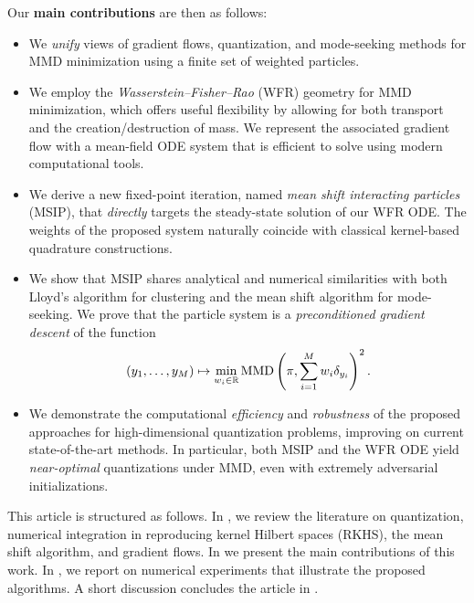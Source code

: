Our \textbf{main contributions} are then as follows:
\begin{itemize}
\item We \textit{unify} views of gradient flows, quantization, and mode-seeking methods for MMD minimization using a finite set of weighted particles.


\item We employ the \emph{Wasserstein--Fisher--Rao} (WFR) geometry for MMD minimization, which offers useful flexibility by allowing for both transport and the creation/destruction of mass. We represent the associated gradient flow with a mean-field ODE system that is efficient to solve using modern computational tools. 

\item We derive a new fixed-point iteration, named \emph{mean shift interacting particles} (MSIP), that \textit{directly} targets the steady-state solution of our WFR ODE. The weights of the proposed system naturally coincide with classical kernel-based quadrature constructions. 

\item We show that MSIP shares analytical and numerical similarities with both Lloyd's algorithm for clustering and the mean shift algorithm for mode-seeking. We prove that the particle system is a \textit{preconditioned gradient descent} of the function $$(y_1, \dots, y_M) \mapsto \min_{w_i \in \mathbb{R}} \operatorname{MMD} \left(\pi, \sum\limits_{i =1}^{M} w_{i} \delta_{y_i} \right)^2.$$ 


\item We demonstrate the computational \textit{efficiency} and \textit{robustness} of the proposed approaches for high-dimensional quantization problems, improving on current state-of-the-art methods. %
In particular, both MSIP and the WFR ODE yield \textit{near-optimal} quantizations under MMD, even with extremely adversarial initializations. 



\end{itemize}



This article is structured as follows. In , we review the literature on quantization, numerical integration in reproducing kernel Hilbert spaces (RKHS), the mean shift algorithm, and gradient flows. In  we present the main contributions of this work. In , we report on numerical experiments that illustrate the proposed algorithms. A short discussion concludes the article in .

